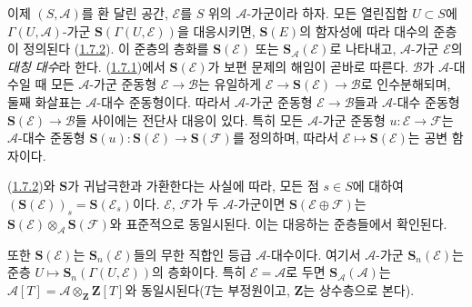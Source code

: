 \begin{env}[1.7.4]
\label{II.1.7.4-ko}
이제 $(S,\mathcal{A})$를 환 달린 공간, $\mathcal{E}$를 $S$ 위의
$\mathcal{A}$-가군이라 하자. 모든 열린집합 $U\subset S$에
$\Gamma(U,\mathcal{A})$-가군
$\mathbf{S}(\Gamma(U,\mathcal{E}))$을 대응시키면,
$\mathbf{S}(E)$의 함자성에 따라 대수의 준층이 정의된다
(\hyperref[II.1.7.2-ko]{1.7.2}). 이 준층의 층화를
$\mathbf{S}(\mathcal{E})$ 또는
$\mathbf{S}_{\mathcal{A}}(\mathcal{E})$로 나타내고,
$\mathcal{A}$-가군 $\mathcal{E}$의 \emph{대칭 대수}라 한다.
(\hyperref[II.1.7.1-ko]{1.7.1})에서
$\mathbf{S}(\mathcal{E})$가 보편 문제의 해임이 곧바로 따른다.
$\mathcal{B}$가 $\mathcal{A}$-대수일 때 모든 $\mathcal{A}$-가군
준동형 $\mathcal{E}\to\mathcal{B}$는 유일하게
$\mathcal{E}\to\mathbf{S}(\mathcal{E})\to\mathcal{B}$로 인수분해되며,
둘째 화살표는 $\mathcal{A}$-대수 준동형이다. 따라서
$\mathcal{A}$-가군 준동형 $\mathcal{E}\to\mathcal{B}$들과
$\mathcal{A}$-대수 준동형
$\mathbf{S}(\mathcal{E})\to\mathcal{B}$들 사이에는 전단사 대응이
있다. 특히 모든 $\mathcal{A}$-가군 준동형
$u:\mathcal{E}\to\mathcal{F}$는 $\mathcal{A}$-대수 준동형
$\mathbf{S}(u):\mathbf{S}(\mathcal{E})\to
\mathbf{S}(\mathcal{F})$를 정의하며, 따라서
$\mathcal{E}\mapsto\mathbf{S}(\mathcal{E})$는 공변 함자이다.

(\hyperref[II.1.7.2-ko]{1.7.2})와 $\mathbf{S}$가 귀납극한과 가환한다는
사실에 따라, 모든 점 $s\in S$에 대하여
$(\mathbf{S}(\mathcal{E}))_s=\mathbf{S}(\mathcal{E}_s)$이다.
$\mathcal{E}$, $\mathcal{F}$가 두 $\mathcal{A}$-가군이면
$\mathbf{S}(\mathcal{E}\oplus\mathcal{F})$는
$\mathbf{S}(\mathcal{E})\otimes_{\mathcal{A}}
\mathbf{S}(\mathcal{F})$와 표준적으로 동일시된다. 이는 대응하는
준층들에서 확인된다.

또한 $\mathbf{S}(\mathcal{E})$는 $\mathbf{S}_n(\mathcal{E})$들의 무한
직합인 등급 $\mathcal{A}$-대수이다. 여기서 $\mathcal{A}$-가군
$\mathbf{S}_n(\mathcal{E})$는 준층
$U\mapsto\mathbf{S}_n(\Gamma(U,\mathcal{E}))$의 층화이다. 특히
$\mathcal{E}=\mathcal{A}$로 두면
$\mathbf{S}_{\mathcal{A}}(\mathcal{A})$는
$\mathcal{A}[T]=\mathcal{A}\otimes_{\mathbf{Z}}\mathbf{Z}[T]$와
동일시된다($T$는 부정원이고, $\mathbf{Z}$는 상수층으로 본다).
\end{env}

